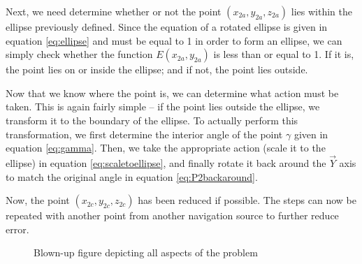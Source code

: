 \documentclass{IEEEtran}
\begin{document}
Next, we need determine whether or not the point $(x_{2a}, y_{2a}, z_{2a})$ lies within
the ellipse previously defined.  Since the equation of a rotated ellipse is given in
equation \ref{eq:ellipse} and must be equal to 1 in order to form an ellipse, we can
simply check whether the function $E(x_{2a}, y_{2a})$ is less than or equal to 1.  If it
is, the point lies on or inside the ellipse; and if not, the point lies outside.

Now that we know where the point is, we can determine what action must be taken.  This
is again fairly simple -- if the point lies outside the ellipse, we transform it to the
boundary of the ellipse.  To actually perform this transformation, we first determine the
interior angle of the point $\gamma$ given in equation \ref{eq:gamma}.  Then, we take
the appropriate action (scale it to the ellipse) in equation \ref{eq:scaletoellipse}, and
finally rotate it back around the $\vec{Y}$ axis to match the original angle in equation
\ref{eq:P2backaround}.

Now, the point $(x_{2c}, y_{2c}, z_{2c})$ has been reduced if possible.  The steps can now
be repeated with another point from another navigation source to further reduce error.

\begin{figure*}[h]
\begin{centering}
\caption{Blown-up figure depicting all aspects of the problem}
\label{fig:big}
\end{centering}
\end{figure*}
\end{document}
